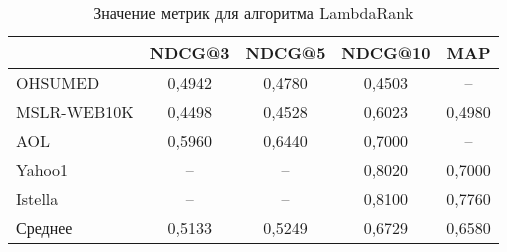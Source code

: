 \begin{table}[!ht]
	\begin{center}
		\begin{threeparttable}
			\captionsetup{justification=raggedright,singlelinecheck=off}
			\caption{Значение метрик для алгоритма LambdaRank}
			\label{tbl:LambdaRankM}
			\begin{tabular}{|l|c|c|c|c|}
				\hline
				\makecell[c]{Датасет} & NDCG@3 & NDCG@5 & NDCG@10 & MAP \\\hline
				OHSUMED	&0,4942&	0,4780&	0,4503&	--\\\hline
				MSLR-WEB10K&0,4498&	0,4528&	0,6023&	0,4980\\\hline
				AOL&0,5960&	0,6440&	0,7000&	--\\\hline
				Yahoo1&	--&	--&	0,8020&	0,7000\\\hline
				Istella&--&	--&	0,8100&	0,7760\\\hline
				Среднее& 0,5133	&0,5249	&0,6729	&0,6580\\\hline
			\end{tabular}
		\end{threeparttable}
	\end{center}
\end{table}

\clearpage

